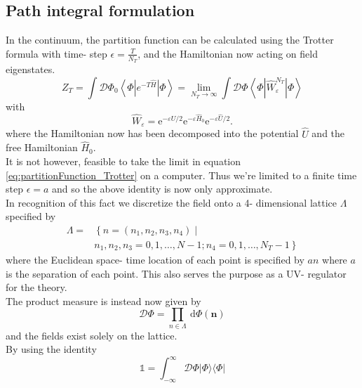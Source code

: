 \documentclass[a4paper,10pt]{book}
\begin{document}
\subsection{Path integral formulation}
In the continuum, the partition function can be calculated using the Trotter formula with time- step $\epsilon = \frac{T}{N_T}$, and the Hamiltonian now acting on field eigenstates.  
\begin{equation}\label{eq:partitionFunction_Trotter}
Z_{T}=\int \mathcal{D} \Phi_{0}\left\langle\Phi\left|e^{-T \widehat{H}}\right| \Phi\right\rangle=\lim _{N_{T} \rightarrow \infty} \int \mathcal{D} \Phi\left\langle\Phi\left|\widehat{W}_{\varepsilon}^{N_{T}}\right| \Phi\right\rangle
\end{equation}
with
\begin{equation}\label{eq:W_trotter}
\widehat{W}_{\varepsilon}=\mathrm{e}^{-\varepsilon \hat{U} / 2} \mathrm{e}^{-\varepsilon \widehat{H}_{0}} \mathrm{e}^{-\varepsilon \widehat{U} / 2}.
\end{equation}
where the Hamiltonian now has been decomposed into the potential $\hat{U}$ and the free Hamiltonian $\widehat{H}_{0}$. \\It is not however, feasible to take the limit in equation \eqref{eq:partitionFunction_Trotter} on a computer. Thus we're limited to a finite time step $\epsilon = a$ and so the above identity is now only approximate.\\In recognition of this fact we discretize the field onto a 4- dimensional lattice $\Lambda$ specified by
\begin{equation}
\begin{aligned}
\Lambda=&\left\{n=\left(n_{1}, n_{2}, n_{3}, n_{4}\right) \mid\right.\\
&\left.n_{1}, n_{2}, n_{3}=0,1, \ldots, N-1 ; n_{4}=0,1, \ldots, N_{T}-1\right\}
\end{aligned}
\end{equation}
where the Euclidean space- time location of each point is specified by $an$ where $a$ is the separation of each point. This also serves the purpose as a UV- regulator for the theory.\\ The product measure is instead now given by
\begin{equation}
\mathcal{D} \Phi=\prod_{n \in \Lambda} \mathrm{~d} \Phi(\boldsymbol{n})
\end{equation}
and the fields exist solely on the lattice.\\ By using the identity 
\begin{equation}
\mathbb{1}=\int_{-\infty}^{\infty} \mathcal{D} \Phi|\Phi\rangle\langle\Phi|
\end{equation}
\end{document}
